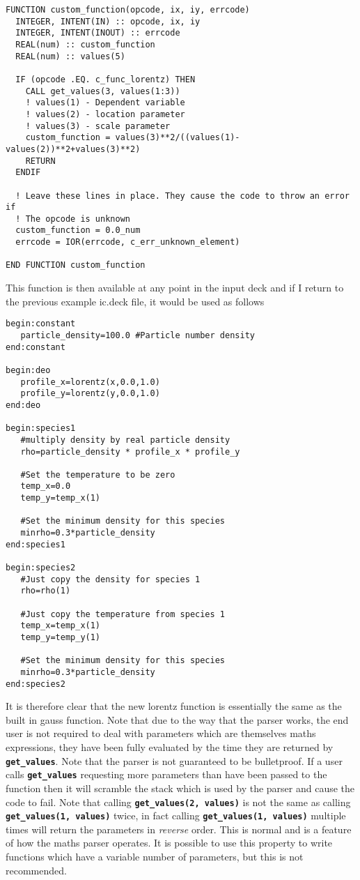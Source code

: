 \documentclass[12pt,a4paper]{article}
\newcommand{\simpleboxverbatim}{\begin{Verbatim}[obeytabs=true,frame=single,
  framerule=0.5mm,rulecolor=\color{warwickmid},formatcom=\color{black}]}
\newcommand{\inlinecode}[1]{{\color{warwickred} \bf\texttt{#1}}}
\begin{document}
\simpleboxverbatim
FUNCTION custom_function(opcode, ix, iy, errcode)
  INTEGER, INTENT(IN) :: opcode, ix, iy
  INTEGER, INTENT(INOUT) :: errcode
  REAL(num) :: custom_function
  REAL(num) :: values(5)

  IF (opcode .EQ. c_func_lorentz) THEN
    CALL get_values(3, values(1:3))
    ! values(1) - Dependent variable
    ! values(2) - location parameter
    ! values(3) - scale parameter
    custom_function = values(3)**2/((values(1)-values(2))**2+values(3)**2)
    RETURN
  ENDIF

  ! Leave these lines in place. They cause the code to throw an error if
  ! The opcode is unknown
  custom_function = 0.0_num
  errcode = IOR(errcode, c_err_unknown_element)

END FUNCTION custom_function
\end{Verbatim}

This function is then available at any point in the input deck and if I return
to the previous example ic.deck file, it would be used as follows

\simpleboxverbatim
begin:constant
   particle_density=100.0 #Particle number density
end:constant

begin:deo
   profile_x=lorentz(x,0.0,1.0)
   profile_y=lorentz(y,0.0,1.0)
end:deo

begin:species1
   #multiply density by real particle density
   rho=particle_density * profile_x * profile_y

   #Set the temperature to be zero
   temp_x=0.0
   temp_y=temp_x(1)

   #Set the minimum density for this species
   minrho=0.3*particle_density
end:species1

begin:species2
   #Just copy the density for species 1
   rho=rho(1)

   #Just copy the temperature from species 1
   temp_x=temp_x(1)
   temp_y=temp_y(1)

   #Set the minimum density for this species
   minrho=0.3*particle_density
end:species2
\end{Verbatim}

It is therefore clear that the new lorentz function is essentially the same as
the built in gauss function. Note that due to the way that the parser works,
the end user is not required to deal with parameters which are themselves
maths expressions, they have been fully evaluated by the time they are
returned by \inlinecode{get\_values}. Note that the parser is not guaranteed to
be bulletproof. If a user calls \inlinecode{get\_values} requesting more
parameters than have been passed to the function then it will scramble the
stack which is used by the parser and cause the code to fail. Note that
calling \inlinecode{get\_values(2, values)} is not the same as calling
\inlinecode{get\_values(1, values)} twice, in fact calling
\inlinecode{get\_values(1, values)} multiple times will return the parameters in
{\it reverse} order. This is normal and is a feature of how the maths parser
operates. It is possible to use this property to write functions which have a
variable number of parameters, but this is not recommended.
\end{document}
